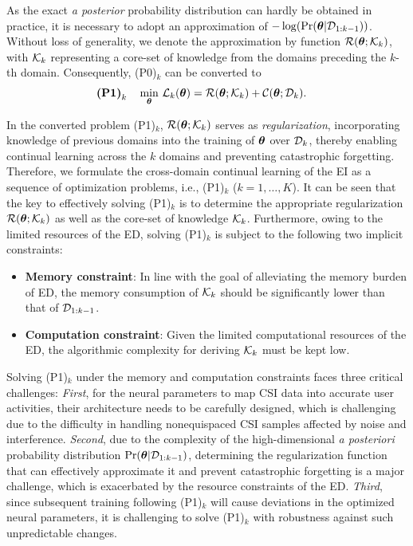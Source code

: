 As the exact \emph{a posterior} probability distribution can hardly be obtained in practice, it is necessary to adopt an approximation of $- \log (\operatorname{Pr}(\bm\theta|\mathcal{D}_{1:k-1}))$.
Without loss of generality, we denote the approximation by function $\mathcal R(\bm\theta; \mathcal{K}_{k})$, with $\mathcal{K}_{k}$ representing a core-set of knowledge from the domains preceding the $k$-th domain.
Consequently, (P0)$_k$ can be converted to
\begin{align}
    \text{\textbf{(P1)}}_k \quad \min_{\bm \theta}~ &\mathcal{L}_k(\bm\theta) = \mathcal R(\bm \theta; \mathcal{K}_{k}) + \mathcal C(\bm\theta; \mathcal{D}_k). \nonumber 
\end{align}

In the converted problem (P1)$_k$, $\mathcal{R}(\bm\theta;\mathcal{K}_{k})$ serves as \emph{regularization}, incorporating knowledge of previous domains into the training of $\bm\theta$ over $\mathcal{D}_k$, thereby enabling continual learning across the $k$ domains and preventing catastrophic forgetting.
Therefore, we formulate the cross-domain continual learning of the EI as a sequence of optimization problems, i.e., (P1)$_k$ ($k=1,\dots,K$). 
It can be seen that the key to effectively solving (P1)$_k$ is to determine the appropriate regularization $\mathcal{R}(\bm\theta;\mathcal{K}_{k})$ as well as the core-set of knowledge $\mathcal{K}_{k}$.
Furthermore, owing to the limited resources of the ED, solving (P1)$_k$ is subject to the following two implicit constraints:
\begin{itemize}[leftmargin=*]
\item \textbf{Memory constraint}: In line with the goal of alleviating the memory burden of ED, the memory consumption of $\mathcal{K}_{k}$ should be significantly lower than that of $\mathcal{D}_{1:k-1}$.
\item \textbf{Computation constraint}: Given the limited computational resources of the ED, the algorithmic complexity for deriving $\mathcal{K}_{k}$ must be kept low.
\end{itemize}



Solving (P1)$_k$ under the memory and computation constraints faces three critical challenges:
\emph{First}, for the neural parameters to map CSI data into accurate user activities, their architecture needs to be carefully designed, which is challenging due to the difficulty in handling nonequispaced CSI samples affected by noise and interference.
\emph{Second}, due to the complexity of the high-dimensional \emph{a posteriori} probability distribution $\operatorname{Pr}(\bm \theta| \mathcal{D}_{1:k-1})$, determining the regularization function that can effectively approximate it and prevent catastrophic forgetting is a major challenge, which is exacerbated by the resource constraints of the ED. 
\emph{Third}, since subsequent training following (P1)$_k$ will cause deviations in the optimized neural parameters, it is challenging to solve (P1)$_k$ with robustness against such unpredictable changes.

\endinput